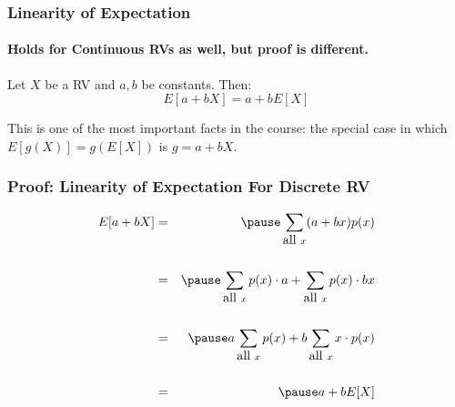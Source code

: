 \documentclass[handout]{beamer}
\begin{document}
\begin{frame}
\frametitle{Linearity of Expectation}
\framesubtitle{Holds for Continuous RVs as well, but proof is different.}
Let $X$ be a RV and $a,b$ be constants. Then:
	$$E[a + bX] = a + bE[X]$$
\vspace{2em}
\begin{alertblock}{This is one of the most important facts in the course: the special case in which $E[g(X)] = g(E[X])$ is $g = a+bX$.}
\end{alertblock}
\end{frame}
\begin{frame}
\frametitle{Proof: Linearity of Expectation For Discrete RV}

\begin{eqnarray*}
	E[a + bX] &=& \pause \sum_{\mbox{all } x}  (a + bx) p(x)\\ \\
	 &=&\pause  \sum_{\mbox{all } x} p(x) \cdot a + \sum_{\mbox{all } x}p(x) \cdot bx\\ \\
	&=& \pause a\sum_{\mbox{all } x} p(x) + b\sum_{\mbox{all } x} x \cdot p(x) \\ \\
	&=& \pause a + b E[X]
\end{eqnarray*}


\end{frame}
\end{document}
